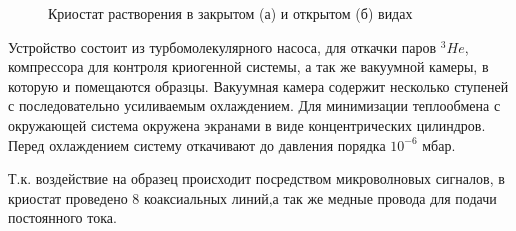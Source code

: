 \begin{figure}[h]
\begin{minipage}[h]{0.49\linewidth}
	\end{minipage}
	\caption{Криостат растворения в закрытом (а) и открытом (б) видах}
	\label{ris:image1}
\end{figure}

Устройство состоит из турбомолекулярного насоса, для откачки паров ${^{3}He}$, компрессора для контроля криогенной системы, а так же вакуумной камеры, в которую и помещаются образцы. Вакуумная камера содержит несколько ступеней с последовательно усиливаемым охлаждением. Для минимизации теплообмена с окружающей система окружена экранами в виде концентрических цилиндров. Перед охлаждением систему откачивают до давления порядка $10^{-6}$ мбар. 

Т.к. воздействие на образец происходит посредством микроволновых сигналов, в криостат проведено 8 коаксиальных линий,а  так же медные провода для подачи постоянного тока.

